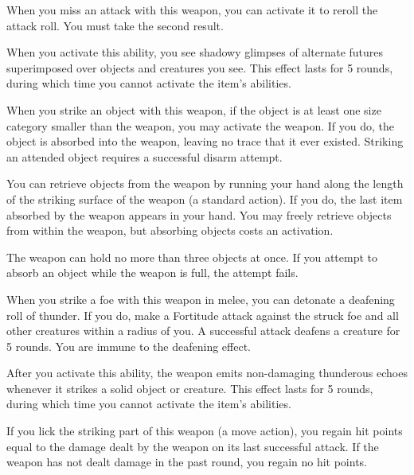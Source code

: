  When you miss an attack with this weapon, you can activate it to reroll the attack roll.
You must take the second result.

When you activate this ability, you see shadowy glimpses of alternate futures superimposed over objects and creatures you see.
This effect lasts for 5 rounds, during which time you cannot activate the item's abilities.


 When you strike an object with this weapon, if the object is at least one size category smaller than the weapon, you may activate the weapon.
If you do, the object is absorbed into the weapon, leaving no trace that it ever existed.
Striking an attended object requires a successful disarm attempt.

You can retrieve objects from the weapon by running your hand along the length of the striking surface of the weapon (a standard action).
If you do, the last item absorbed by the weapon appears in your hand.
You may freely retrieve objects from within the weapon, but absorbing objects costs an activation.

The weapon can hold no more than three objects at once.
If you attempt to absorb an object while the weapon is full, the attempt fails.


 When you strike a foe with this weapon in melee, you can detonate a deafening roll of thunder.
If you do, make a Fortitude attack against the struck foe and all other creatures within a \areasmall radius of you.
A successful attack deafens a creature for 5 rounds.
You are immune to the deafening effect.

After you activate this ability, the weapon emits non-damaging thunderous echoes whenever it strikes a solid object or creature.
This effect lasts for 5 rounds, during which time you cannot activate the item's abilities.


 If you lick the striking part of this weapon (a move action), you regain hit points equal to the damage dealt by the weapon on its last successful attack.
If the weapon has not dealt damage in the past round, you regain no hit points.

